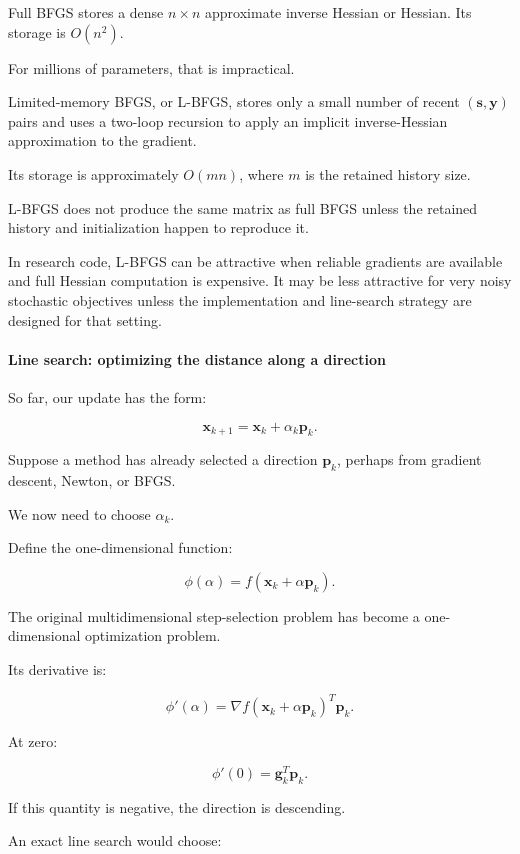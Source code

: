 Full BFGS stores a dense \(n\times n\) approximate inverse Hessian or Hessian. Its storage is \(O(n^2)\).

For millions of parameters, that is impractical.

Limited-memory BFGS, or L-BFGS, stores only a small number of recent \((\mathbf s,\mathbf y)\) pairs and uses a two-loop recursion to apply an implicit inverse-Hessian approximation to the gradient.

Its storage is approximately \(O(mn)\), where \(m\) is the retained history size.

L-BFGS does not produce the same matrix as full BFGS unless the retained history and initialization happen to reproduce it.

In research code, L-BFGS can be attractive when reliable gradients are available and full Hessian computation is expensive. It may be less attractive for very noisy stochastic objectives unless the implementation and line-search strategy are designed for that setting.

\paragraph{Line search: optimizing the distance along a direction}\label{line-search-optimizing-the-distance-along-a-direction}

So far, our update has the form:

\[
\mathbf x_{k+1}=\mathbf x_k+\alpha_k\mathbf p_k.
\]

Suppose a method has already selected a direction \(\mathbf p_k\), perhaps from gradient descent, Newton, or BFGS.

We now need to choose \(\alpha_k\).

Define the one-dimensional function:

\[
\boxed{ \phi(\alpha)=f(\mathbf x_k+\alpha\mathbf p_k) }.
\]

The original multidimensional step-selection problem has become a one-dimensional optimization problem.

Its derivative is:

\[
\phi'(\alpha)= \nabla f(\mathbf x_k+\alpha\mathbf p_k)^T\mathbf p_k.
\]

At zero:

\[
\phi'(0)=\mathbf g_k^T\mathbf p_k.
\]

If this quantity is negative, the direction is descending.

An exact line search would choose:

